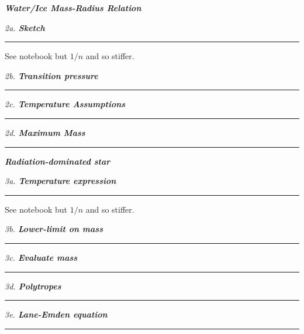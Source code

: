 \documentclass[12pt, letterpaper, twoside]{article}
\newcommand{\question}[1]{{\noindent \it #1}}
\newcommand{\answer}[1]{
    \par\noindent\rule{\textwidth}{0.4pt}#1\vspace{0.5cm}
}
\begin{document}
\question{\textbf{Water/Ice Mass-Radius Relation}}

\question{2a. \textbf{Sketch}}
\answer{
    See notebook but $1/n$ and so stiffer.
}

\question{2b. \textbf{Transition pressure}}
\answer{

}

\question{2c. \textbf{Temperature Assumptions}}
\answer{

}

\question{2d. \textbf{Maximum Mass}}
\answer{

}

\question{\textbf{Radiation-dominated star}}

\question{3a. \textbf{Temperature expression}}
\answer{
    See notebook but $1/n$ and so stiffer.
}

\question{3b. \textbf{Lower-limit on mass}}
\answer{

}

\question{3c. \textbf{Evaluate mass}}
\answer{

}

\question{3d. \textbf{Polytropes}}
\answer{

}

\question{3e. \textbf{Lane-Emden equation}}
\answer{

}
\end{document}
